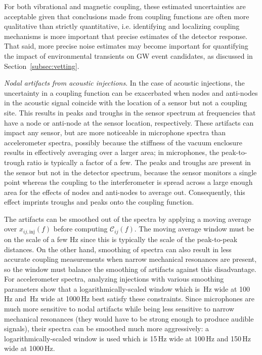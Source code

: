 For both vibrational and magnetic coupling, these estimated uncertainties are acceptable given that conclusions made from coupling functions are often more qualitative than strictly quantitative, i.e. identifying and localizing coupling mechanisms is more important that precise estimates of the detector response.
That said, more precise noise estimates may become important for quantifying the impact of environmental transients on \ac{GW} event candidates, as discussed in Section~\ref{subsec:vetting}.

\textit{Nodal artifacts from acoustic injections}.
In the case of acoustic injections, the uncertainty in a coupling function can be exacerbated when nodes and anti-nodes in the acoustic signal coincide with the location of a sensor but not a coupling site.
This results in peaks and troughs in the sensor spectrum at frequencies that have a node or anti-node at the sensor location, respectively.
These artifacts can impact any sensor, but are more noticeable in microphone spectra than accelerometer spectra, possibly because the stiffness of the vacuum enclosure results in effectively averaging over a larger area; in microphones, the peak-to-trough ratio is typically a factor of a few.
The peaks and troughs are present in the sensor but not in the detector spectrum, because the sensor monitors a single point whereas the coupling to the interferometer is spread across a large enough area for the effects of nodes and anti-nodes to average out.
Consequently, this effect imprints troughs and peaks onto the coupling function.

The artifacts can be smoothed out of the spectra by applying a moving average over $x_{ij,\mathrm{inj}}(f)$ before computing $\mathcal{C}_{ij}(f)$.
The moving average window must be on the scale of a few Hz since this is typically the scale of the peak-to-peak distances.
On the other hand, smoothing of spectra can also result in less accurate coupling measurements when narrow mechanical resonances are present, so the window must balance the smoothing of artifacts against this disadvantage.
For accelerometer spectra, analyzing injections with various smoothing parameters show that a logarithmically-scaled window which is \XX\,Hz wide at 100\,Hz and \XX\,Hz wide at 1000\,Hz best satisfy these constraints.
Since microphones are much more sensitive to nodal artifacts while being less sensitive to narrow mechanical resonances (they would have to be strong enough to produce audible signals), their spectra can be smoothed much more aggressively: a logarithmically-scaled window is used which is 15\,Hz wide at 100\,Hz and 150\,Hz wide at 1000\,Hz.

